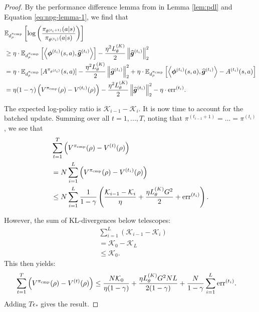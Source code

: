 \begin{proof}
    By the performance difference lemma from \citet{kakade2002approxoptimalrl} in Lemma \ref{lem:pdl} and Equation \ref{eq:npg-lemma-1}, we find that
    \begin{align}
        &\mathbb{E}_{d_\rho^{\pi_{\rm cmp}}}\left[\log\left(\frac{\pi_{\theta^{(t_i+1)}}(a|s)}{\pi_{\theta^{(t_i)}}(a|s)}\right)\right]  \\
        &\geq \eta \cdot \mathbb{E}_{d_\rho^{\pi_{\rm cmp}}}\left[\left\langle \boldsymbol{\phi}^{(t_i)}(s,a), \widehat{\bm{g}}^{(t_i)} \right\rangle\right] - \frac{\eta^2 L^{(K)}_\theta}{2} \left\lVert  \widehat{\bm{g}}^{(t_i)} \right\rVert_2^2 \\
        &= \eta \cdot \mathbb{E}_{d_\rho^{\pi_{\rm cmp}}}\left[A^{\pi_{\theta^{(t_i)}}}(s,a)\right] - \frac{\eta^2 L^{(K)}_\theta}{2} \left\lVert  \widehat{\bm{g}}^{(t_i)} \right\rVert_2^2 + \eta \cdot \mathbb{E}_{d_\rho^{\pi_{\rm cmp}}}\left[\left\langle \boldsymbol{\phi}^{(t_i)}(s,a), \widehat{\bm{g}}^{(t_i)}\right\rangle - A^{(t_i)}(s,a)\right] \\
        &= \eta(1-\gamma)\left(V^{\pi_{\rm cmp}}(\rho) - V^{(t_i)}(\rho)\right) - \frac{\eta^2 L^{(K)}_\theta}{2} \left\lVert  \widehat{\bm{g}}^{(t_i)} \right\rVert_2^2 - \eta \cdot \text{err}^{(t_i)}.
    \end{align}

    The expected log-policy ratio is $\mathcal K_{i-1}-\mathcal K_i$. It is now time to account for the batched update. Summing over all $t=1,...,T$, noting that $\pi^{(t_{i-1}+1)} = ... = \pi^{(t_i)}$, we see that
    \begin{align}
        &\sum_{t=1}^T \left(V^{\pi_{\rm cmp}}(\rho) - V^{(t)}(\rho)\right) \\
        &= N \sum_{i=1}^L \left(V^{\pi_{\rm cmp}}(\rho) - V^{(t_i)}(\rho)\right) \\
        &\leq N \sum_{i=1}^L \frac{1}{1-\gamma}\left(\frac{\mathcal K_{i-1}-\mathcal K_i}{\eta} + \frac{\eta L^{(K)}_\theta G^2}{2} + \text{err}^{(t_i)}\right).
    \end{align}

    However, the sum of KL-divergences below telescopes:
    \begin{align}
        &\sum_{i=1}^L \left(\mathcal K_{i-1}-\mathcal K_i\right) \\
        &=\mathcal K_0-\mathcal K_L\\
        &\leq \mathcal K_0.
    \end{align}
    This then yields:
    \begin{align}
        \sum_{t=1}^T \left(V^{\pi_{\rm cmp}}(\rho) - V^{(t)}(\rho)\right)
        &\leq \frac{N\mathcal K_0}{\eta(1-\gamma)} + \frac{\eta L^{(K)}_\theta G^2 NL}{2(1-\gamma)} + \frac{N}{1-\gamma}\sum_{i=1}^L \text{err}^{(t_i)}.
    \end{align}
Adding $T\epsilon_*$ gives the result.
\end{proof}

